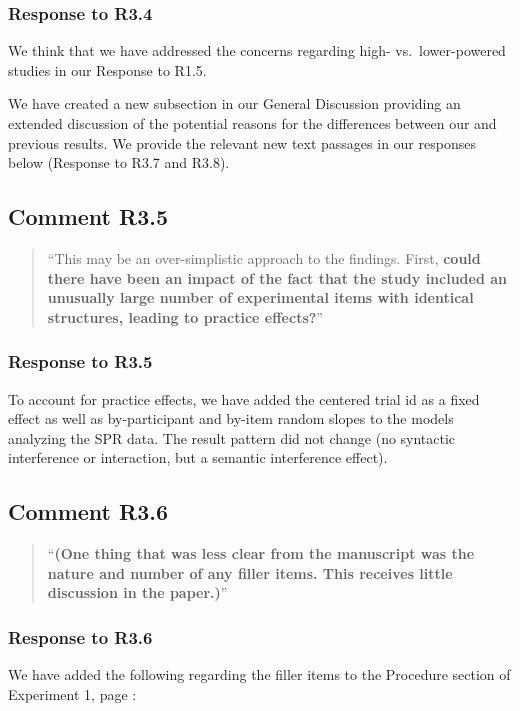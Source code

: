 \documentclass[12pt]{article}
\begin{document}
\subsubsection*{Response to R3.4}
We think that we have addressed the concerns regarding high- vs.\ lower-powered studies in our Response to R1.5. 

We have created a new subsection in our General Discussion providing an extended discussion of the potential reasons for the differences between our and previous results. We provide the relevant new text passages in our responses below (Response to R3.7 and R3.8).

\subsection*{Comment R3.5}
\begin{quote}
``This may be an over-simplistic approach to the findings. First, \textbf{could there have been an impact of the fact that the study included an unusually large number of experimental items with identical structures, leading to practice effects?}''
\end{quote}

\subsubsection*{Response to R3.5}
To account for practice effects, we have added the centered trial id as a fixed effect as well as by-participant and by-item random slopes to the models analyzing the SPR data. The result pattern did not change (no syntactic interference or interaction, but a semantic interference effect).

\subsection*{Comment R3.6}
\begin{quote}
``\textbf{(One thing that was less clear from the manuscript was the nature and number of any filler items. This receives little discussion in the paper.)}''
\end{quote}


\subsubsection*{Response to R3.6}
We have added the following regarding the filler items to the Procedure section of Experiment 1, page \pageref{fillers1}:
\end{document}
